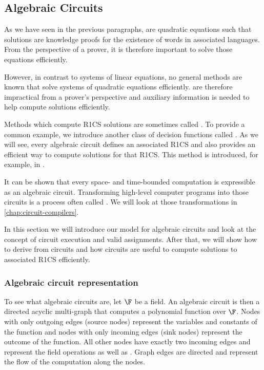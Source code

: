 \subsection{Algebraic Circuits}
\label{sec:circuits} As we have seen in the previous paragraphs,  are quadratic equations such that solutions are knowledge proofs for the existence of words in associated languages. From the perspective of a prover, it is therefore important to solve those equations efficiently. 

However,  in contrast to systems of linear equations, no general methods are known that solve systems of quadratic equations efficiently.  are therefore impractical from a prover's perspective and auxiliary information is needed to help compute solutions efficiently.

Methods which compute R1CS solutions are sometimes called .  To provide a common example, we introduce another class of decision functions called . As we will see, every algebraic circuit defines an associated R1CS and also provides an efficient way to compute solutions for that R1CS. This method is introduced, for example, in \cite{sasson-2013}.

It can be shown that every space- and time-bounded computation is expressible as an algebraic circuit. Transforming high-level computer programs into those circuits is a process often called . We will look at those transformations in \chaptname{} \ref{chap:circuit-compilers}.

In this section we will introduce our model for algebraic circuits and look at the concept of circuit execution and valid assignments. After that, we will show how to derive  from circuits and how circuits are useful to compute solutions to associated R1CS efficiently.
\subsubsection{Algebraic circuit representation} To see what algebraic circuits are, let $\F$ be a field. An algebraic circuit is then a directed acyclic multi-graph that computes a polynomial function over $\F$. Nodes with only outgoing edges (source nodes) represent the variables and constants of the function and nodes with only incoming edges (sink nodes) represent the outcome of the function. All other nodes have exactly two incoming edges and represent the field operations  as well as . Graph edges are directed and represent the flow of the computation along the nodes.

